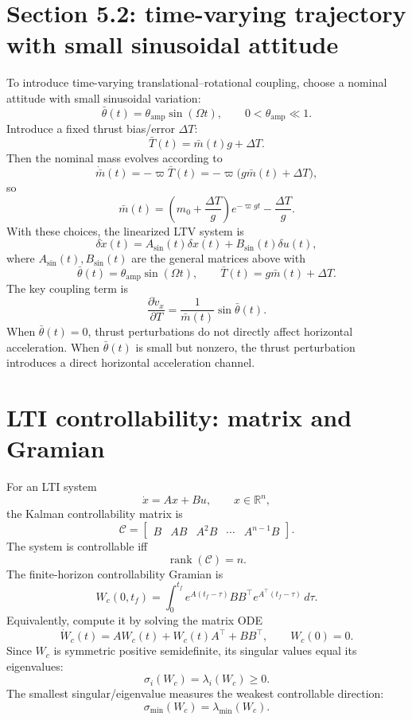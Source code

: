 \documentclass[10pt]{article}
\newcommand{\R}{\mathbb{R}}
\newcommand{\dd}{\delta}
\newcommand{\thb}{\bar\theta}
\newcommand{\mb}{\bar m}
\newcommand{\Tb}{\bar T}
\newcommand{\vphi}{\varpi}
\begin{document}
\section{Section 5.2: time-varying trajectory with small sinusoidal attitude}
To introduce time-varying translational--rotational coupling, choose a nominal attitude with small sinusoidal variation:
\[
    \boxed{\thb(t)=\theta_{\mathrm{amp}}\sin(\Omega t)},
    \qquad
    0<\theta_{\mathrm{amp}}\ll 1.
\]
Introduce a fixed thrust bias/error $\Delta T$:
\[
    \boxed{\Tb(t)=\mb(t)g+\Delta T}.
\]
Then the nominal mass evolves according to
\[
    \dot{\mb}(t)=-\vphi\Tb(t)=-\vphi\bigl(g\mb(t)+\Delta T\bigr),
\]
so
\[
    \boxed{\mb(t)=\left(m_0+\frac{\Delta T}{g}\right)e^{-\vphi gt}-\frac{\Delta T}{g}}.
\]
With these choices, the linearized LTV system is
\[
    \boxed{\dd\dot x(t)=A_{\mathrm{sin}}(t)\dd x(t)+B_{\mathrm{sin}}(t)\dd u(t)},
\]
where $A_{\mathrm{sin}}(t),B_{\mathrm{sin}}(t)$ are the general matrices above with
\[
    \thb(t)=\theta_{\mathrm{amp}}\sin(\Omega t),
    \qquad
    \Tb(t)=g\mb(t)+\Delta T.
\]
The key coupling term is
\[
    \frac{\partial \dot v_x}{\partial T}
    =\frac{1}{\mb(t)}\sin\thb(t).
\]
When $\thb(t)=0$, thrust perturbations do not directly affect horizontal acceleration. When $\thb(t)$ is small but nonzero, the thrust perturbation introduces a direct horizontal acceleration channel.

\section{LTI controllability: matrix and Gramian}
For an LTI system
\[
    \dot x=Ax+Bu,
    \qquad x\in\R^n,
\]
the Kalman controllability matrix is
\[
    \boxed{\mathcal C=\begin{bmatrix}B&AB&A^2B&\cdots&A^{n-1}B\end{bmatrix}}.
\]
The system is controllable iff
\[
    \boxed{\operatorname{rank}(\mathcal C)=n}.
\]
The finite-horizon controllability Gramian is
\[
    \boxed{W_c(0,t_f)=\int_0^{t_f}e^{A(t_f-\tau)}BB^{\top}e^{A^{\top}(t_f-\tau)}\,d\tau}.
\]
Equivalently, compute it by solving the matrix ODE
\[
    \boxed{\dot W_c(t)=AW_c(t)+W_c(t)A^{\top}+BB^{\top},\qquad W_c(0)=0.}
\]
Since $W_c$ is symmetric positive semidefinite, its singular values equal its eigenvalues:
\[
    \sigma_i(W_c)=\lambda_i(W_c)\ge 0.
\]
The smallest singular/eigenvalue measures the weakest controllable direction:
\[
    \boxed{\sigma_{\min}(W_c)=\lambda_{\min}(W_c)}.
\]
\end{document}
